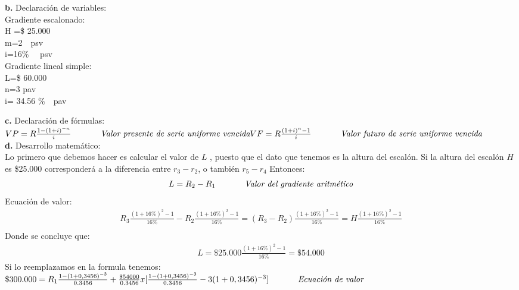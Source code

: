 \textbf{b.}	Declaración de variables:\\
Gradiente escalonado:\\


	H =\$ 25.000\\
	m=2\ \ psv\\
	i=16\% \ \ psv\\

Gradiente lineal simple:\\


	L=\$ 60.000\\
	n=3 pav\\
	i= 34.56 \%\ \ pav

\textbf{c.}	Declaración de fórmulas:\\


	$VP=R \frac{1-(1+i)^{-n}}{i} \hspace{35 pt} \textit{Valor presente de serie uniforme vencida}\\
	VF=R \frac{(1+i)^{n}-1}{i} \hspace{35 pt} \textit{Valor futuro de serie uniforme vencida}$\\


\textbf{d.}	Desarrollo matemático:\\
Lo primero que debemos hacer es calcular el valor de $L$ , puesto que el dato que tenemos es la altura del escalón. Si la altura del escalón $H$ es \$25.000 corresponderá a la diferencia entre $r_{3}-r_{2}$, o también  $r_{5}-r_{4}$ Entonces:
\begin{align*}
	L = R_{2}  -R_{1} \hspace{35 pt} \textit{Valor del gradiente aritmético}\\
\end{align*}
Ecuación de valor:\\
\begin{align*}

	R_{3}\frac{(1+16\%)^{2}-1}{16\%}-R_{2}\frac{(1+16\%)^{2}-1}{16\%}=(R_{3}-R_{2})\frac{(1+16\%)^{2}-1}{16\%}=H \frac{(1+16\%)^{2}-1}{16\%} \\ %
\end{align*}
Donde se concluye que:
\begin{align*}
	L=\$ 25.000 \frac{(1+16\%)^{2}-1}{16\%}=\$ 54.000
\end{align*}
Si lo reemplazamos en la formula tenemos: \\


	$\$ 300.000=R_{1} \frac{1-(1+0,3456)^{-3}}{ 0.3456}+\frac{\$54 000}{0.3456}x[\frac{1-(1+0,3456)^{-3}}{0.3456}-3 (1+0,3456)^{-3}] \hspace{35 pt} \textit{Ecuación de valor}$\\



